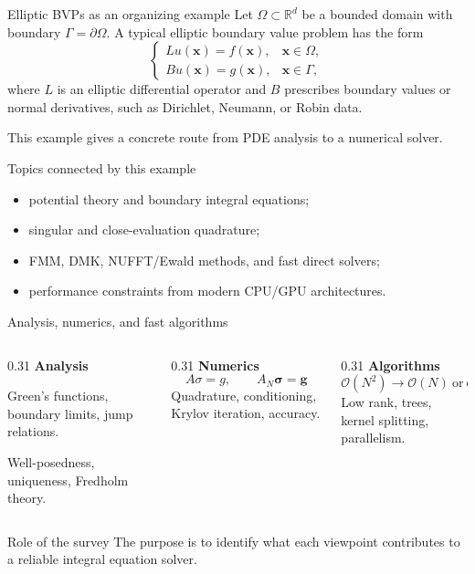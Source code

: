 \documentclass[aspectratio=169,11pt]{beamer}
\newcommand{\R}{\mathbb{R}}
\newcommand{\x}{\bm{x}}
\newcommand{\cO}{\mathcal{O}}
\begin{document}
\begin{frame}{Elliptic BVPs as an organizing example}
\small
Let $\Omega\subset\R^d$ be a bounded domain with boundary
$\Gamma=\partial\Omega$. A typical elliptic boundary value problem has the
form
\[
\begin{cases}
L u(\x)=f(\x), & \x\in\Omega,\\
B u(\x)=g(\x), & \x\in\Gamma,
\end{cases}
\]
where $L$ is an elliptic differential operator and $B$ prescribes boundary
values or normal derivatives, such as Dirichlet, Neumann, or Robin data.

This example gives a concrete route from PDE analysis to a numerical solver.

\begin{block}{Topics connected by this example}
\small
\begin{itemize}\setlength{\itemsep}{0pt}
  \item potential theory and boundary integral equations;
  \item singular and close-evaluation quadrature;
  \item FMM, DMK, NUFFT/Ewald methods, and fast direct solvers;
  \item performance constraints from modern CPU/GPU architectures.
\end{itemize}
\end{block}
\end{frame}

\begin{frame}{Analysis, numerics, and fast algorithms}
\small
\begin{columns}[T,totalwidth=\textwidth]
\begin{column}{0.31\textwidth}
\textbf{Analysis}

Green's functions, boundary limits, jump relations.

Well-posedness, uniqueness, Fredholm theory.
\end{column}
\begin{column}{0.31\textwidth}
\textbf{Numerics}
\[
A\sigma=g,\qquad A_N\bm\sigma=\bm g
\]
Quadrature, conditioning, Krylov iteration, accuracy.
\end{column}
\begin{column}{0.31\textwidth}
\textbf{Algorithms}
\[
\cO(N^2)\to \cO(N)\ \text{or}\ \cO(N\log N)
\]
Low rank, trees, kernel splitting, parallelism.
\end{column}
\end{columns}

\begin{block}{Role of the survey}
The purpose is to identify what each viewpoint contributes to a reliable
integral equation solver.
\end{block}
\end{frame}
\end{document}
